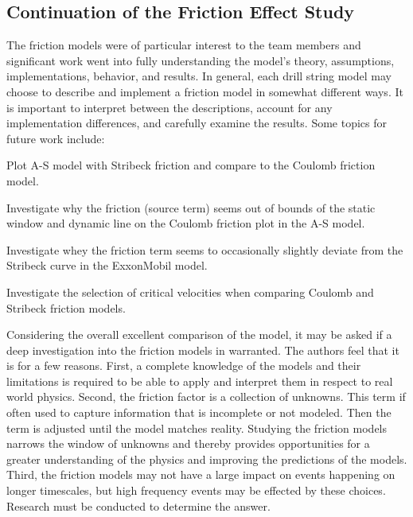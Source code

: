 \subsection{Continuation of the Friction Effect Study}
The friction models were of particular interest to the team members and significant work went into fully understanding the model's theory, assumptions, implementations, behavior, and results.  In general, each drill string model may choose to describe and implement a friction model in somewhat different ways.  It is important to interpret between the descriptions, account for any implementation differences, and carefully examine the results.  Some topics for future work include:
\begin{bulletedlist}
	\item Plot A-S model with Stribeck friction and compare to the Coulomb friction model.
	\item Investigate why the friction (source term) seems out of bounds of the static window and dynamic line on the Coulomb friction plot in the A-S model.
	\item Investigate whey the friction term seems to occasionally slightly deviate from the Stribeck curve in the ExxonMobil model.
	\item Investigate the selection of critical velocities when comparing Coulomb and Stribeck friction models.
\end{bulletedlist}

Considering the overall excellent comparison of the model, it may be asked if a deep investigation into the friction models in warranted. The authors feel that it is for a few reasons.  First, a complete knowledge of the models and their limitations is required to be able to apply and interpret them in respect to real world physics.  Second, the friction factor is a collection of unknowns.  This term if often used to capture information that is incomplete or not modeled.  Then the term is adjusted until the model matches reality.  Studying the friction models narrows the window of unknowns and thereby provides opportunities for a greater understanding of the physics and improving the predictions of the models.  Third, the friction models may not have a large impact on events happening on longer timescales, but high frequency events may be effected by these choices.  Research must be conducted to determine the answer.

